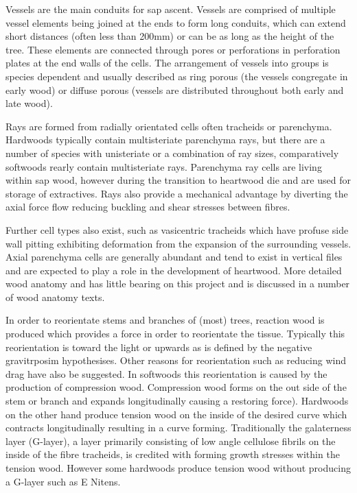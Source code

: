 \documentclass{article}
\begin{document}
Vessels are the main conduits for sap ascent. Vessels are comprised of multiple
vessel elements being joined at the ends to form long conduits, which can extend short
distances (often less than 200mm) or can be as long as the height of the tree.
These elements are connected through pores or perforations in perforation
plates at the end walls of the cells. The arrangement of vessels into groups is
species dependent and usually described as ring porous (the vessels congregate in early wood)
or diffuse porous (vessels are distributed throughout both early and late wood).

Rays are formed from radially orientated cells often tracheids or parenchyma.
Hardwoods typically contain multisteriate parenchyma rays, but there are a
number of species with unisteriate or a combination of ray sizes, comparatively softwoods rearly
contain multisteriate rays. Parenchyma ray cells are living within sap wood,
however during the transition to heartwood die and are used for storage of
extractives. Rays also provide a mechanical advantage by diverting the
axial force flow reducing buckling and shear stresses between fibres.

Further cell types also exist, such as vasicentric tracheids which have profuse
side wall pitting exhibiting deformation from the expansion of the surrounding
vessels. Axial parenchyma cells are generally abundant and tend to exist in
vertical files and are expected to play a role in the development of heartwood.
More detailed wood anatomy and has little bearing on this project and is
discussed in a number of wood anatomy texts.

In order to reorientate stems and branches of (most) trees, reaction wood is
produced which provides a force in order to reorientate the tissue. Typically this
reorientation is toward the light or upwards as is defined by the negative
gravitrposim hypothesises. Other reasons for reorientation such as reducing wind
drag have also be suggested. In softwoods this reorientation is caused by the
production of compression wood. Compression wood forms on the out side of the
stem or branch and expands longitudinally causing a
restoring force). Hardwoods on the other hand produce tension wood on the inside
of the desired curve which contracts longitudinally resulting in a curve forming.
Traditionally the galaterness layer (G-layer), a layer primarily consisting of
low angle cellulose fibrils on the inside of the fibre tracheids, is credited with forming growth
stresses within the tension wood. However some hardwoods produce tension wood
without producing a G-layer such as E Nitens.
\end{document}
